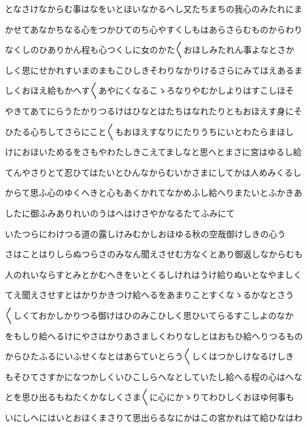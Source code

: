\documentclass[a4paper,11pt,landscape]{ltjtarticle}
\begin{document}
\par\medskip
となさけなからむ事はなをいとほいなかるへし又たちまちの我心のみたれにま
\par\medskip
かせてあなかちなる心をつかひてのち心やすくしもはあらさらむものからわり
\par\medskip
なくしのひありかん程も心つくしに女のかた〱おほしみたれん事よなとさか
\par\medskip
しく思にせかれすいまのまもこひしきそわりなかりけるさらにみてはえあるま
\par\medskip
しくおほえ給もかへす〱あやにくなるこゝろなりやむかしよりはすこしほそ
\par\medskip
やきてあてにらうたかりつるけはひなとはたちはなれたりともおほえす身にそ
\par\medskip
ひたる心ちしてさらにこと〱もおほえすなりにたりうちにいとわたらまほし
\par\medskip
けにおほいためるをさもやわたしきこえてましなと思へとまさに宮はゆるし給
\par\medskip
てんやさりとて忍ひてはたいとひんなからむいかさまにしてかは人めみくるし
\par\medskip
からて思ふ心のゆくへきと心もあくかれてなかめふし給へりまたいとふかきあ
\par\medskip
したに御ふみありれいのうはへはけさやかなるたてふみにて
\par\medskip
いたつらにわけつる道の露しけみむかしおほゆる秋の空哉御けしきの心う
\par\medskip
さはことはりしらぬつらさのみなん聞えさせむ方なくとあり御返しなからむも
\par\medskip
人のれいならすとみとかむへきをいとくるしけれはうけ給りぬいとなやましく
\par\medskip
てえ聞えさせすとはかりかきつけ給へるをあまりことすくなゝるかなとさう
\par\medskip
〱しくておかしかりつる御けはひのみこひしく思ひいてらるすこしよのなか
\par\medskip
をもしり給へるけにやさはかりあさましくわりなしとはおもひ給へりつるもの
\par\medskip
からひたふるにいふせくなとはあらていとらう〱しくはつかしけなるけしき
\par\medskip
もそひてさすかになつかしくいひこしらへなとしていたし給へる程の心はへな
\par\medskip
とを思ひ出るもねたくかなしくさま〱に心にかゝりてわひしくおほゆ何事も
\par\medskip
いにしへにはいとおほくまさりて思出らるなにかはこの宮かれはて給ひなはわ
\par\medskip
\end{document}
